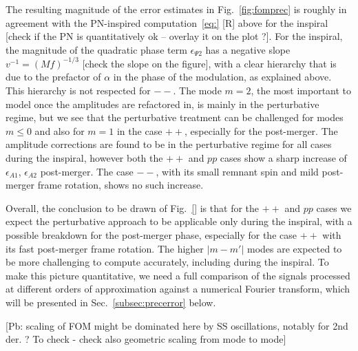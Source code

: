 \documentclass[aps,showpacs,twocolumn,
prd,superscriptaddress,nofootinbib]{revtex4-1}
\newcommand{\SM}[1]{{\color{Red} #1}}
\begin{document}
The resulting magnitude of the error estimates in Fig.~\ref{fig:fomprec} is roughly in agreement with the PN-inspired computation~\ref{eq:} \SM{[R]} above for the inspiral \SM{[check if the PN is quantitatively ok -- overlay it on the plot ?]}. For the inspiral, the magnitude of the quadratic phase term $\epsilon_{\Psi 2}$ has a negative slope $v^{-1}=(Mf)^{-1/3}$ \SM{[check the slope on the figure]}, with a clear hierarchy that is due to the prefactor of $\alpha$ in the phase of the modulation, as explained above. This hierarchy is not respected for $--$. The mode $m=2$, the most important to model once the amplitudes are refactored in, is mainly in the perturbative regime, but we see that the perturbative treatment can be challenged for modes $m\leq 0$ and also for $m=1$ in the case $++$, especially for the post-merger. The amplitude corrections are found to be in the perturbative regime for all cases during the inspiral, however both the $++$ and $pp$ cases show a sharp increase of $\epsilon_{A1}$, $\epsilon_{A2}$ post-merger. The case $--$, with its small remnant spin and mild post-merger frame rotation, shows no such increase.

Overall, the conclusion to be drawn of Fig.~\ref{} is that for the $++$ and $pp$ cases we expect the perturbative approach to be applicable only during the inspiral, with a possible breakdown for the post-merger phase, especially for the case $++$ with its fast post-merger frame rotation. The higher $|m-m'|$ modes are expected to be more challenging to compute accurately, including during the inspiral. To make this picture quantitative, we need a full comparison of the signals processed at different orders of approximation against a numerical Fourier transform, which will be presented in Sec.~\ref{subsec:precerror} below.

\SM{[Pb: scaling of FOM might be dominated here by SS oscillations, notably for 2nd der. ? To check - check also geometric scaling from mode to mode]}
\end{document}
